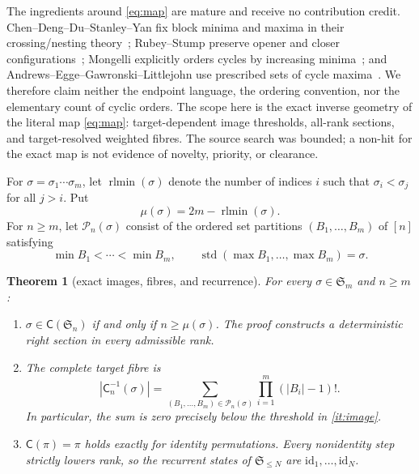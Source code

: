 \documentclass[a4paper,10pt]{amsart}
\newtheorem{theorem}{Theorem}
\theoremstyle{remark}
\newcommand{\Sym}{\mathfrak S}
\newcommand{\std}{\operatorname{std}}
\newcommand{\CME}{\mathsf C}
\newcommand{\rtlmin}{\operatorname{rlmin}}
\begin{document}
The ingredients around \eqref{eq:map} are mature and receive no contribution
credit.  Chen--Deng--Du--Stanley--Yan fix block minima and maxima in their
crossing/nesting theory~\cite{ChenDengDuStanleyYan2005}; Rubey--Stump preserve
opener and closer configurations~\cite{RubeyStump2009}; Mongelli explicitly
orders cycles by increasing minima~\cite{Mongelli2012}; and
Andrews--Egge--Gawronski--Littlejohn use prescribed sets of cycle
maxima~\cite{AndrewsEggeGawronskiLittlejohn2011}.  We therefore claim neither
the endpoint language, the ordering convention, nor the elementary count of
cyclic orders.  The scope here is the exact inverse geometry of the literal
map \eqref{eq:map}: target-dependent image thresholds, all-rank sections, and
target-resolved weighted fibres.  The source search was bounded; a non-hit for
the exact map is not evidence of novelty, priority, or clearance.

For $\sigma=\sigma_1\cdots\sigma_m$, let $\rtlmin(\sigma)$ denote the number
of indices $i$ such that $\sigma_i<\sigma_j$ for all $j>i$.  Put
\begin{equation}\label{eq:mu}
 \mu(\sigma)=2m-\rtlmin(\sigma).
\end{equation}
For $n\ge m$, let $\mathcal P_n(\sigma)$ consist of the ordered set
partitions $(B_1,\ldots,B_m)$ of $[n]$ satisfying
\begin{equation}\label{eq:support-class}
 \min B_1<\cdots<\min B_m,
 \qquad \std(\max B_1,\ldots,\max B_m)=\sigma.
\end{equation}

\begin{theorem}[exact images, fibres, and recurrence]\label{thm:main}
For every $\sigma\in\Sym_m$ and $n\ge m$:
\begin{enumerate}
\item\label{it:image}
$\sigma\in\CME(\Sym_n)$ if and only if $n\ge\mu(\sigma)$.  The proof
constructs a deterministic right section in every admissible rank.
\item\label{it:fibre}
The complete target fibre is
\begin{equation}\label{eq:fibre}
 |\CME_n^{-1}(\sigma)|
 =\sum_{(B_1,\ldots,B_m)\in\mathcal P_n(\sigma)}
       \prod_{i=1}^m(|B_i|-1)!.
\end{equation}
In particular, the sum is zero precisely below the threshold in
\ref{it:image}.
\item\label{it:recurrent}
$\CME(\pi)=\pi$ holds exactly for identity permutations.  Every
nonidentity step strictly lowers rank, so the recurrent states of
$\Sym_{\le N}$ are $\mathrm{id}_1,\ldots,\mathrm{id}_N$.
\end{enumerate}
\end{theorem}
\end{document}
